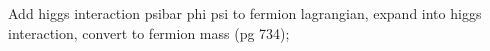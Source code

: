         Add higgs interaction psibar phi psi to fermion lagrangian, expand into higgs interaction, convert to fermion mass (pg 734);



        



%
%
%


%
%
%
%        
%
%
%
